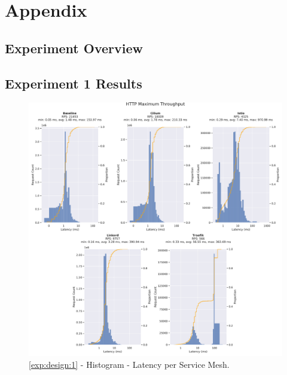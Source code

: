 \chapter*{Appendix}

\section{Experiment Overview}





\section{Experiment 1 Results}

\begin{figure}[h]
    \centering
    
    \includegraphics[width=\linewidth]{5_experimental_evaluation/figures/exp_01-latency-results.pdf}

    \caption{\ref{exp:design:1} - Histogram - Latency per Service Mesh.}
    
    \label{fig:appendix:exp:result:01:latency:histogram}
\end{figure}

